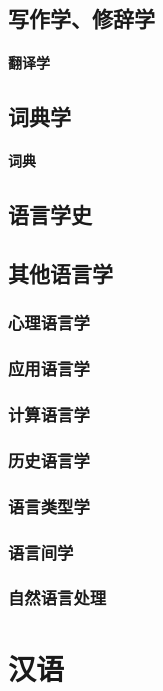 \documentclass[UTF8]{../../RepresentationUniverse}
\begin{document}
\section{写作学、修辞学}
    \subsubsection{翻译学}
\section{词典学}
    \subsubsection{词典}


\section{语言学史}

\section{其他语言学}
    \subsection{心理语言学}
    \subsection{应用语言学}
    \subsection{计算语言学}
    \subsection{历史语言学}
    \subsection{语言类型学}
    \subsection{语言间学}
    \subsection{自然语言处理}


\chapter{汉语}
\end{document}
